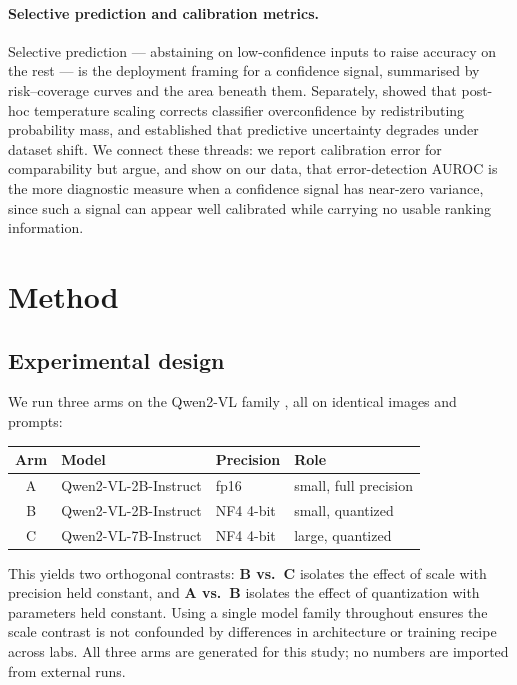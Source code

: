 \documentclass[11pt]{article}
\begin{document}
\paragraph{Selective prediction and calibration metrics.}
Selective prediction --- abstaining on low-confidence inputs to raise accuracy on
the rest --- is the deployment framing for a confidence signal, summarised by
risk--coverage curves and the area beneath them. Separately,
\citet{guo2017calibration} showed that post-hoc temperature scaling corrects
classifier overconfidence by redistributing probability mass, and
\citet{ovadia2019trust} established that predictive uncertainty degrades under
dataset shift. We connect these threads: we report calibration error for
comparability but argue, and show on our data, that error-detection AUROC is the
more diagnostic measure when a confidence signal has near-zero variance, since
such a signal can appear well calibrated while carrying no usable ranking
information.

\section{Method}

\subsection{Experimental design}
We run three arms on the Qwen2-VL family \citep{wang2024qwen2}, all on identical
images and prompts:

\begin{center}
\begin{tabular}{@{}clll@{}}
\toprule
Arm & Model & Precision & Role \\
\midrule
A & Qwen2-VL-2B-Instruct & fp16      & small, full precision \\
B & Qwen2-VL-2B-Instruct & NF4 4-bit & small, quantized \\
C & Qwen2-VL-7B-Instruct & NF4 4-bit & large, quantized \\
\bottomrule
\end{tabular}
\end{center}

\noindent This yields two orthogonal contrasts: \textbf{B vs.\ C} isolates the
effect of scale with precision held constant, and \textbf{A vs.\ B} isolates the
effect of quantization with parameters held constant. Using a single model
family throughout ensures the scale contrast is not confounded by differences in
architecture or training recipe across labs. All three arms are generated for
this study; no numbers are imported from external runs.
\end{document}

